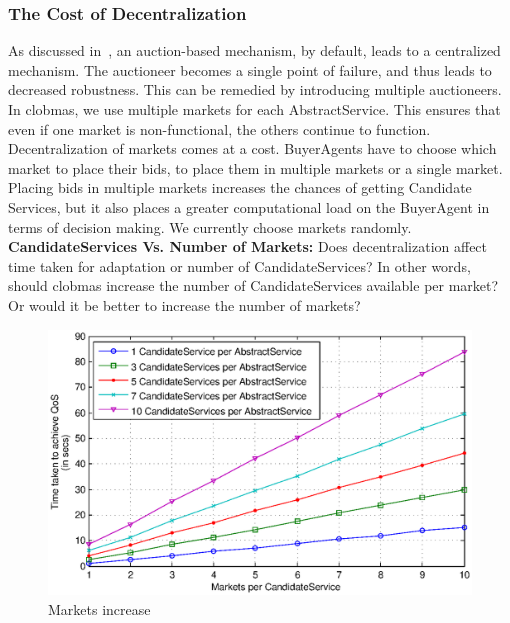 \documentclass[10pt,journal,compsoc]{IEEEtran}
\begin{document}
\subsubsection{The Cost of Decentralization}
As discussed in~\cite{Eymann2003Decentralized}, an auction-based mechanism, by default, leads to a centralized mechanism. The auctioneer becomes a single point of failure, and thus leads to decreased robustness. This can be remedied by introducing multiple auctioneers. In clobmas, we use multiple markets for each AbstractService. This ensures that even if one market is non-functional, the others continue to function. Decentralization of markets comes at a cost. BuyerAgents have to choose which market to place their bids, to place them in multiple markets or a single market. Placing bids in multiple markets increases the chances of getting Candidate Services, but it also places a greater computational load on the BuyerAgent in terms of decision making. We currently choose markets randomly.\\
\textbf{CandidateServices Vs. Number of Markets:} Does decentralization affect time taken for adaptation or number of CandidateServices? In other words, should clobmas increase the number of CandidateServices available per market? Or would it be better to increase the number of markets? 
\begin{figure}[htbp]
  \centering
  \includegraphics[clip, trim=0cm 13cm 3cm 6cm, scale=0.40]{Figure18.eps}
  \caption{Markets increase\label{fig:svc_per_mkt}}		
\end{figure}
\end{document}
